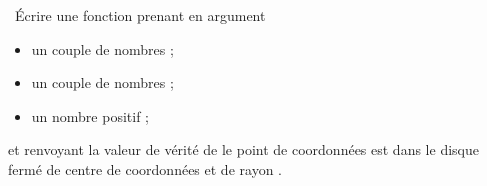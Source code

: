 \question\ Écrire une fonction  prenant en argument 
\begin{itemize}
  \item un couple de nombres  ; 
  \item un couple de nombres  ; 
  \item un nombre positif  ;
\end{itemize}
et renvoyant la valeur de vérité de \og le point de coordonnées  est dans le disque fermé de centre de coordonnées  et de rayon  \fg. 